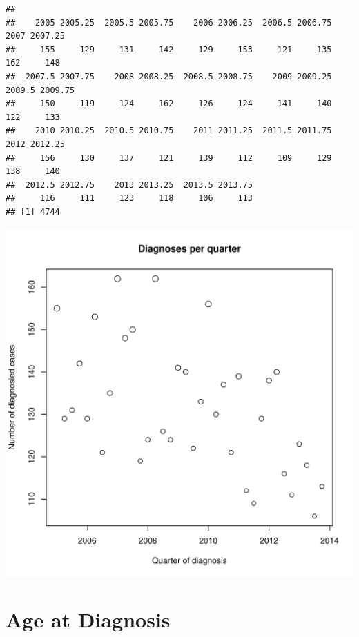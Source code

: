 \documentclass{article}\usepackage[]{graphicx}\usepackage[]{color}
\makeatletter
\def\maxwidth{ %
  \ifdim\Gin@nat@width>\linewidth
    \linewidth
  \else
    \Gin@nat@width
  \fi
}
\newenvironment{kframe}{%
 \def\at@end@of@kframe{}%
 \ifinner\ifhmode%
  \def\at@end@of@kframe{\end{minipage}}%
  \begin{minipage}{\columnwidth}%
 \fi\fi%
 \def\FrameCommand##1{\hskip\@totalleftmargin \hskip-\fboxsep
 \colorbox{shadecolor}{##1}\hskip-\fboxsep
     \hskip-\linewidth \hskip-\@totalleftmargin \hskip\columnwidth}%
 \MakeFramed {\advance\hsize-\width
   \@totalleftmargin\z@ \linewidth\hsize
   \@setminipage}}%
 {\par\unskip\endMakeFramed%
 \at@end@of@kframe}
\newenvironment{knitrout}{}{} %
\makeatother
\begin{document}
\begin{knitrout}\footnotesize
{}\color{fgcolor}\begin{kframe}
\begin{verbatim}
## 
##    2005 2005.25  2005.5 2005.75    2006 2006.25  2006.5 2006.75    2007 2007.25 
##     155     129     131     142     129     153     121     135     162     148 
##  2007.5 2007.75    2008 2008.25  2008.5 2008.75    2009 2009.25  2009.5 2009.75 
##     150     119     124     162     126     124     141     140     122     133 
##    2010 2010.25  2010.5 2010.75    2011 2011.25  2011.5 2011.75    2012 2012.25 
##     156     130     137     121     139     112     109     129     138     140 
##  2012.5 2012.75    2013 2013.25  2013.5 2013.75 
##     116     111     123     118     106     113
## [1] 4744
\end{verbatim}
\end{kframe}

{\centering \includegraphics[width=\maxwidth]{figure/minimal-diagnoses} 

}



\end{knitrout}


\section{Age at Diagnosis}
\end{document}

